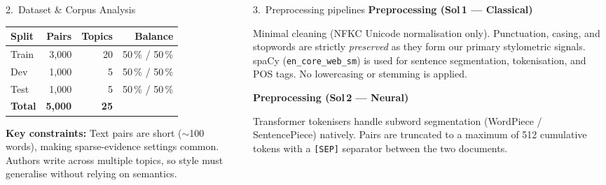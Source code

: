 \documentclass[final,t]{beamer}
\begin{document}
\begin{frame}[t]
\begin{columns}[T,totalwidth=\linewidth]
\begin{column}{0.32\linewidth}
\begin{exampleblock}{2.\ Dataset \& Corpus Analysis}
      \vspace{0.4ex}
      \begin{center}
      \normalsize
      \renewcommand{\arraystretch}{1.2}
      \setlength{\tabcolsep}{10pt}
      \begin{tabular}{lrrr}
        \toprule
        \textbf{Split} & \textbf{Pairs} & \textbf{Topics} & \textbf{Balance}\\
        \midrule
        Train &  3,000 & 20 & 50\,\% / 50\,\% \\
        Dev   &  1,000 &  5 & 50\,\% / 50\,\% \\
        Test  &  1,000 &  5 & 50\,\% / 50\,\% \\
        \midrule
        \textbf{Total} & \textbf{5,000} & \textbf{25} & \\
        \bottomrule
      \end{tabular}
      \end{center}

      \vspace{0.4ex}
      \textbf{Key constraints:} Text pairs are short ($\sim$100 words), making
      sparse-evidence settings common. Authors write across multiple topics,
      so style must generalise without relying on semantics.
    \end{exampleblock}
  \end{column}

  \begin{column}{0.32\linewidth}
    \begin{exampleblock}{3.\ Preprocessing pipelines}
      \textbf{Preprocessing (Sol\,1 — Classical)}\par
      \vspace*{0.2ex}
      Minimal cleaning (NFKC Unicode normalisation only). Punctuation, casing,
      and stopwords are strictly \emph{preserved} as they form our primary
      stylometric signals. spaCy (\texttt{en\_core\_web\_sm}) is used for
      sentence segmentation, tokenisation, and POS tags. No lowercasing
      or stemming is applied.

      \vspace{0.8ex}
      \textbf{Preprocessing (Sol\,2 — Neural)}\par
      \vspace*{0.2ex}
      Transformer tokenisers handle subword segmentation (WordPiece /
      SentencePiece) natively. Pairs are truncated to a maximum of 512
      cumulative tokens with a \texttt{[SEP]} separator between the
      two documents.


\end{exampleblock}
\end{column}
\end{columns}
\end{frame}
\end{document}
